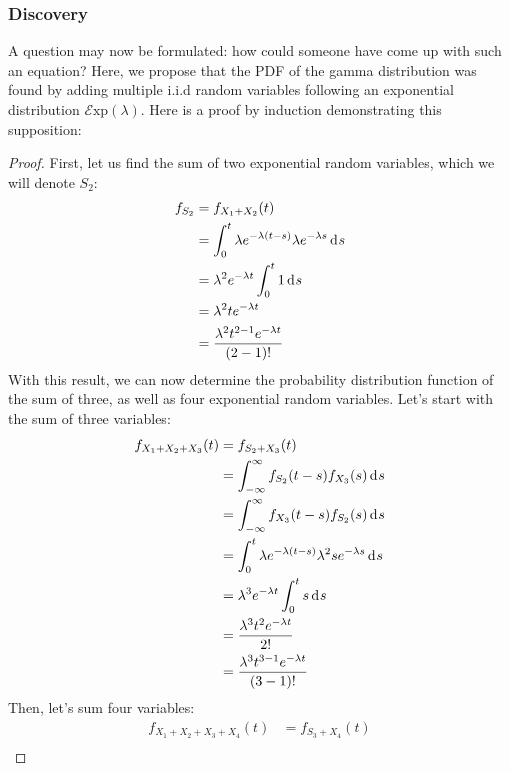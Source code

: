 \documentclass[12pt]{article}
\newcommand{\E}{\mathcal{E}}
\begin{document}
\subsubsection{Discovery }
A question may now be formulated: how could someone have come up with such an equation? Here, we propose that
the PDF of the gamma distribution was found by adding multiple i.i.d random variables following an exponential
distribution $\E\text{xp}(\lambda)$. Here is a proof by induction demonstrating this supposition:
\begin{proof}
	First, let us find the sum of two exponential random variables, which we will denote $S_2$:
	\begin{equation}
		\begin{split}
			f_{S_2}	&=	f_{X_1 + X_2} (t)\\
					&=	\int^t_0 \lambda e^{-\lambda(t-s)}\lambda e^{-\lambda s}\mathop{}\!\mathrm{d^{}}s\\
					&=	\lambda^2 e^{-\lambda t}\int^t_0 1\mathop{}\!\mathrm{d^{}}s\\
					&=	\lambda^2 te^{-\lambda t}\\
					&=	\frac{\lambda^2 t^{2-1} e^{-\lambda t}}{(2-1)!}
		\end{split}
	\end{equation}
	With this result, we can now determine the probability distribution function of the sum of three, as well as four
	exponential random variables. Let's start with the sum of three variables:
	\begin{equation}
		\begin{split}
			f_{X_1 + X_2 + X_3}(t)	&=	f_{S_2 + X_3}(t)\\
			 						&=	\int^\infty_{-\infty} f_{S_2}(t-s)f_{X_3}(s)\mathop{}\!\mathrm{d^{}}s\\
			 						&=	\int^\infty_{-\infty} f_{X_3}(t-s)f_{S_2}(s)\mathop{}\!\mathrm{d^{}}s\\
			 						&=	\int^t_0 \lambda e^{-\lambda(t-s)}\lambda^2 s e^{-\lambda s}\mathop{}\!\mathrm{d^{}}s\\
									&=	\lambda^3 e^{-\lambda t} \int^t_0 s\mathop{}\!\mathrm{d^{}}s\\
									&=	\frac{\lambda^3 t^2 e^{-\lambda t}}{2!}\\
									&=	\frac{\lambda^3 t^{3-1} e^{-\lambda t}}{(3-1)!}
		\end{split}
	\end{equation}
	Then, let's sum four variables:
	\begin{equation}
		\begin{split}
			f_{X_1+X_2+X_3+X_4}(t)	&=	f_{S_3+X_4}(t)\\

\end{split}
\end{equation}
\end{proof}
\end{document}
